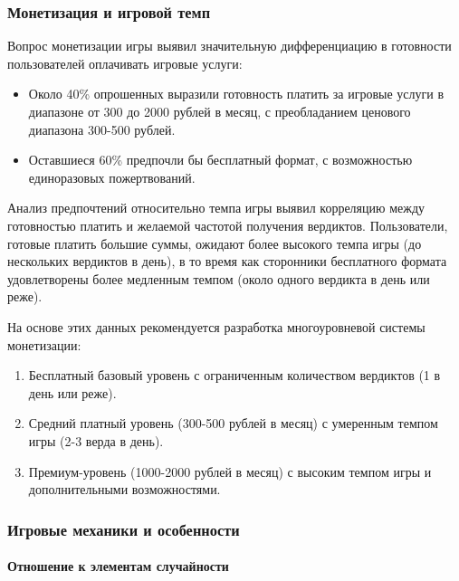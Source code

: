 \subsubsection{Монетизация и игровой темп}

Вопрос монетизации игры выявил значительную дифференциацию в готовности пользователей оплачивать игровые услуги:

\begin{itemize}
    \item Около 40\% опрошенных выразили готовность платить за игровые услуги в диапазоне от 300 до 2000 рублей в месяц, с преобладанием ценового диапазона 300-500 рублей.

    \item Оставшиеся 60\% предпочли бы бесплатный формат, с возможностью единоразовых пожертвований.
\end{itemize}

Анализ предпочтений относительно темпа игры выявил корреляцию между готовностью платить и желаемой частотой получения вердиктов. Пользователи, готовые платить большие суммы, ожидают более высокого темпа игры (до нескольких вердиктов в день), в то время как сторонники бесплатного формата удовлетворены более медленным темпом (около одного вердикта в день или реже).

На основе этих данных рекомендуется разработка многоуровневой системы монетизации:

\begin{enumerate}
    \item Бесплатный базовый уровень с ограниченным количеством вердиктов (1 в день или реже).

    \item Средний платный уровень (300-500 рублей в месяц) с умеренным темпом игры (2-3 верда в день).

    \item Премиум-уровень (1000-2000 рублей в месяц) с высоким темпом игры и дополнительными возможностями.
\end{enumerate}

\subsubsection{Игровые механики и особенности}

\paragraph{Отношение к элементам случайности}

